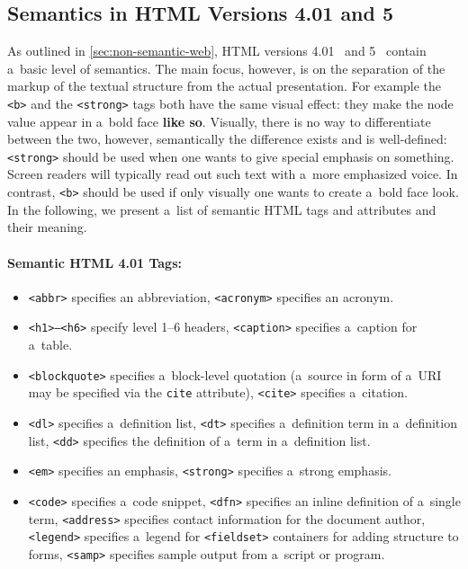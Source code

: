 \subsection{Semantics in HTML Versions 4.01 and 5}

As outlined in \autoref{sec:non-semantic-web},
HTML versions 4.01~\cite{raggett1999html}
and 5~\cite{berjon2012html5}
contain a~basic level of semantics.
The main focus, however, is on the separation of
the markup of the textual structure from the actual presentation.
For example the \texttt{<b>} and the \texttt{<strong>} tags
both have the same visual effect:
they make the node value appear in a~bold face \textbf{like so}.
Visually, there is no way to differentiate between the two,
however, semantically the difference exists and is well-defined:
\texttt{<strong>} should be used when
one wants to give special emphasis on something.
Screen readers will typically read out such text
with a~more emphasized voice.
In contrast, \texttt{<b>} should be used
if only visually one wants to create a~bold face look.
In the following, we present a~list of semantic HTML tags
and attributes and their meaning.

\paragraph{Semantic HTML 4.01 Tags:}

\begin{itemize}
  \item \texttt{<abbr>} specifies an abbreviation,
        \texttt{<acronym>} specifies an acronym.
  \item \texttt{<h1>--<h6>} specify level 1--6 headers,
        \texttt{<caption>} specifies a~caption for a~table.
  \item \texttt{<blockquote>} specifies a~block-level quotation
        (a~source in form of a~URI may be specified via the
        \texttt{cite} attribute),
        \texttt{<cite>} specifies a~citation.
  \item \texttt{<dl>} specifies a~definition list, \texttt{<dt>}
        specifies a~definition term in a~definition list,
        \texttt{<dd>} specifies the definition of a~term
        in a~definition list.
  \item \texttt{<em>} specifies an emphasis, \texttt{<strong>}
        specifies a~strong emphasis.
  \item \texttt{<code>} specifies a~code snippet, \texttt{<dfn>}
        specifies an inline definition of a~single term,
        \texttt{<address>} specifies contact information
        for the document author, \texttt{<legend>} specifies
        a~legend for \texttt{<fieldset>} containers
        for adding structure to forms,
        \texttt{<samp>} specifies sample output
        from a~script or program.
\end{itemize}

